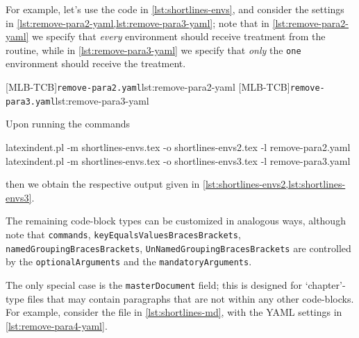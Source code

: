 	For example, let's use the code in \cref{lst:shortlines-envs}, and consider the settings in \cref{lst:remove-para2-yaml,lst:remove-para3-yaml};
	note that in \cref{lst:remove-para2-yaml} we specify that \emph{every} environment should receive
	treatment from the routine, while in \cref{lst:remove-para3-yaml} we specify that \emph{only} the
	\texttt{one} environment should receive the treatment.

	\begin{minipage}{.45\linewidth}
	\end{minipage}
	\hfill
	\begin{minipage}{.49\linewidth}
		[MLB-TCB]{\texttt{remove-para2.yaml}}{lst:remove-para2-yaml}
		[MLB-TCB]{\texttt{remove-para3.yaml}}{lst:remove-para3-yaml}
	\end{minipage}

	Upon running the commands
	\begin{widepage}
		\begin{commandshell}
latexindent.pl -m shortlines-envs.tex -o shortlines-envs2.tex -l remove-para2.yaml
latexindent.pl -m shortlines-envs.tex -o shortlines-envs3.tex -l remove-para3.yaml
\end{commandshell}
	\end{widepage}
	then we obtain the respective output given in \cref{lst:shortlines-envs2,lst:shortlines-envs3}.


	The remaining code-block types can be customized in analogous ways, although note that \texttt{commands},
	\texttt{keyEqualsValuesBracesBrackets}, \texttt{namedGroupingBracesBrackets}, \texttt{UnNamedGroupingBracesBrackets}
	are controlled by the \texttt{optionalArguments} and the \texttt{mandatoryArguments}.

	The only special case is the \texttt{masterDocument} field; this is designed for `chapter'-type files that
	may contain paragraphs that are not within any other code-blocks. For example, consider the file in
	\cref{lst:shortlines-md}, with the YAML settings in \cref{lst:remove-para4-yaml}.

